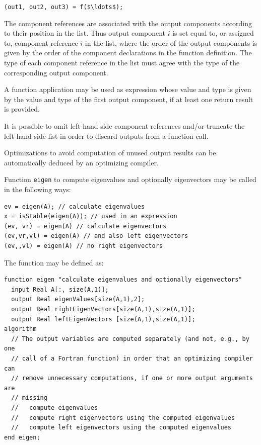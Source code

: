 \lstinline!(out1, out2, out3) = f($\ldots$);!

The component references are associated with the output components according to their position in the list.
Thus output component $i$ is set equal to, or assigned to, component reference $i$ in the list, where the order of the output components is given by the order of the component declarations in the function definition.
The type of each component reference in the list must agree with the type of the corresponding output component.

A function application may be used as expression whose value and type is given by the value and type of the first output component, if at least one return result is provided.

It is possible to omit left-hand side component references and/or truncate the left-hand side list in order to discard outputs from a function call.

\begin{nonnormative}
Optimizations to avoid computation of unused output results can be automatically deduced by an optimizing compiler.
\end{nonnormative}

\begin{example}
Function \lstinline!eigen! to compute eigenvalues and optionally eigenvectors may be called in the following ways:
\begin{lstlisting}[language=modelica]
ev = eigen(A); // calculate eigenvalues
x = isStable(eigen(A)); // used in an expression
(ev, vr) = eigen(A) // calculate eigenvectors
(ev,vr,vl) = eigen(A) // and also left eigenvectors
(ev,,vl) = eigen(A) // no right eigenvectors
\end{lstlisting}
The function may be defined as:
\begin{lstlisting}[language=modelica]
function eigen "calculate eigenvalues and optionally eigenvectors"
  input Real A[:, size(A,1)];
  output Real eigenValues[size(A,1),2];
  output Real rightEigenVectors[size(A,1),size(A,1)];
  output Real leftEigenVectors [size(A,1),size(A,1)];
algorithm
  // The output variables are computed separately (and not, e.g., by one
  // call of a Fortran function) in order that an optimizing compiler can
  // remove unnecessary computations, if one or more output arguments are
  // missing
  //   compute eigenvalues
  //   compute right eigenvectors using the computed eigenvalues
  //   compute left eigenvectors using the computed eigenvalues
end eigen;
\end{lstlisting}
\end{example}


